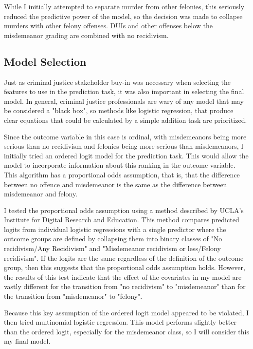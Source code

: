 \documentclass{article}
\begin{document}
While I initially attempted to separate murder from other felonies, this seriously reduced the predictive power of the model, so the decision was made to collapse murders with other felony offenses. DUIs and other offenses below the misdemeanor grading are combined with no recidivism. 

\subsection{Model Selection}

Just as criminal justice stakeholder buy-in was necessary when selecting the features to use in the prediction task, it was also important in selecting the final model. In general, criminal justice professionals are wary of any model that may be considered a "black box", so methods like logistic regression, that produce clear equations that could be calculated by a simple addition task are prioritized. 

Since the outcome variable in this case is ordinal, with misdemeanors being more serious than no recidivism and felonies being more serious than misdemeanors, I initially tried an ordered logit model for the prediction task. This would allow the model to incorporate information about this ranking in the outcome variable. This algorithm has a proportional odds assumption, that is, that the difference between no offence and misdemeanor is the same as the difference between misdemeanor and felony.

I tested the proportional odds assumption using a method described by UCLA's Institute for Digital Research and Education.\cite{ucla} This method compares predicted logits from individual logistic regressions with a single predictor where the outcome groups are defined by collapsing them into binary classes of "No recidivism/Any Recidivism" and "Misdemeanor recidivism or less/Felony recidivism". If the logits are the same regardless of the definition of the outcome group, then this suggests that the proportional odds assumption holds. However, the results of this test indicate that the effect of the covariates in my model are vastly different for the transition from "no recidivism" to "misdemeanor" than for the transition from "misdemeanor" to "felony". 

Because this key assumption of the ordered logit model appeared to be violated, I then tried multinomial logistic regression. This model performs slightly better than the ordered logit, especially for the misdemeanor class, so I will consider this my final model. 
\end{document}
